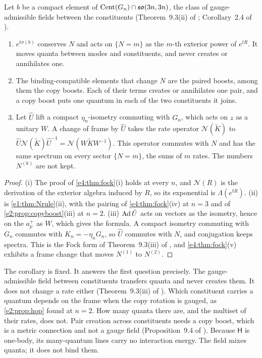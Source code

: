 \begin{corollary}
\label{e4:cor:transfer}
Let $b$ be a compact element of $\operatorname{Cent}(G_n)\cap\mathfrak{so}(3n,3n)$, the class of gauge-admissible fields between the constituents (Theorem~9.3(ii) of
\cite{RE}; Corollary~2.4 of \cite{ES17}).
\begin{enumerate}[label=(\roman*),leftmargin=2.2em]
\item $e^{t\sigma(b)}$ conserves $N$ and acts on $\{N=m\}$ as the $m$-th exterior power of $e^{tR}$. It moves quanta between modes and
constituents, and never creates or annihilates one.
\item The binding-compatible elements that change $N$ are the paired boosts, among them the copy boosts. Each of their terms creates or
annihilates one pair, and a copy boost puts one quantum in each of the two constituents it joins.
\item Let $\hat U$ lift a compact $\eta_n$-isometry commuting with $G_n$, which acts on $z$ as a unitary $W$. A change of frame by $\hat U$ takes the
rate operator $\mathcal N(\tilde K)$ to $\hat U\mathcal N(\tilde K)\hat U^{-1}=\mathcal N(W\tilde KW^{-1})$. This operator commutes with $N$ and has the same
spectrum on every sector $\{N=m\}$, the sums of $m$ rates. The numbers $N^{(k)}$ are not kept.
\end{enumerate}
\end{corollary}

\begin{proof}
(i) The proof of \cref{e4:thm:fock}(i) holds at every $n$, and $\mathcal N(R)$ is the derivation of the exterior algebra induced by $R$, so its
exponential is $\Lambda(e^{tR})$. (ii) is \cref{e1:thm:Nrule}(ii), with the pairing of \cref{e4:thm:fock}(iv) at $n=3$ and of
\cref{e2:prop:copyboost}(iii) at $n=2$. (iii) $\operatorname{Ad}\hat U$ acts on vectors as the isometry, hence on the $a^+_p$ as $W$, which gives the formula. A compact isometry commuting with $G_n$
commutes with $K_n=-\eta_nG_n$, so $\hat U$ commutes with $N$, and conjugation keeps spectra. This is the Fock form of Theorem~9.3(iii) of
\cite{RE}, and \cref{e4:thm:fock}(v) exhibits a frame change that moves $N^{(1)}$ to $N^{(2)}$.
\end{proof}

The corollary is fixed. It answers the first question precisely. The gauge-admissible field between constituents transfers quanta and never
creates them. It does not change a rate either (Theorem~9.3(iii) of \cite{RE}). Which constituent carries a quantum depends on the frame
when the copy rotation is gauged, as \cref{e2:prop:hop} found at $n=2$. How many quanta there are, and the multiset of their rates, does not.
Pair creation across constituents needs a copy boost, which is a metric connection and not a gauge field (Proposition~9.4 of \cite{RE}).
Because $\mathsf H$ is one-body, its many-quantum lines carry no interaction energy. The field mixes quanta; it does not bind them.

